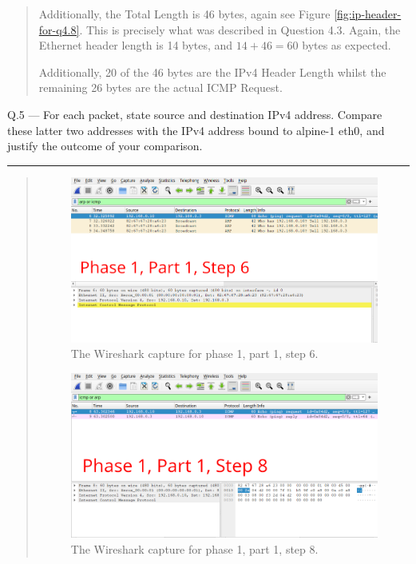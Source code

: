 \documentclass{article}
\newcommand\Que[2]{%
   \begin{samepage}
   \leavevmode\par
   \noindent
   Q.#1 --- #2\par\vspace{10pt}\hrule\vspace{10pt}
   \end{samepage}}
\newenvironment{ans}
   {\fbox{Answer}\begin{quote}\nopagebreak}
   {\end{quote}}
\begin{document}
\begin{ans}
Additionally, the Total Length is 46 bytes, again see
Figure \ref{fig:ip-header-for-q4.8}. This is precisely what
was described in Question 4.3. Again, the Ethernet header
length is 14 bytes, and $14 + 46 = 60$ bytes as expected.

Additionally, 20 of the 46 bytes are the IPv4 Header Length
whilst the remaining 26 bytes are the actual ICMP Request.
\end{ans}

\Que{5}{For each packet, state source and destination IPv4
address. Compare these latter two addresses with the IPv4
address bound to alpine-1 eth0, and justify the outcome of your
comparison.}

\begin{ans}
\begin{figure}[H]
\centering
\includegraphics[width=14cm]{data/q5-capture1.png}
\caption{The Wireshark capture for phase 1, part 1, step 6.}
\label{fig:wireshark-capture1-q5}
\end{figure}

\begin{figure}[H]
\centering
\includegraphics[width=14cm]{data/q5-capture2.png}
\caption{The Wireshark capture for phase 1, part 1, step 8.}
\label{fig:wireshark-capture2-q5}
\end{figure}


\end{ans}
\end{document}

